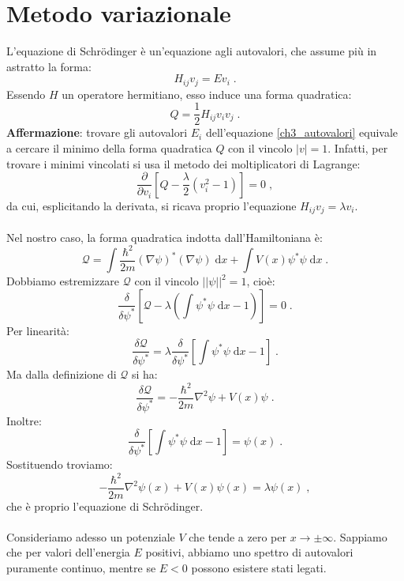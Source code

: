 \documentclass[12pt,a4paper]{report}
\theoremstyle{definition}
\numberwithin{equation}{section}
\newcommand{\diff}[1][]{\mathrm{d}#1}
\begin{document}
\section{Metodo variazionale}
L'equazione di Schrödinger è un'equazione agli autovalori, che assume più in astratto la forma:
\begin{equation}
H_{ij}v_j=Ev_i\;. \label{ch3_autovalori}
\end{equation}
Essendo $H$ un operatore hermitiano, esso induce una forma quadratica:
\begin{equation}
Q=\frac{1}{2}H_{ij}v_iv_j\;.
\end{equation}
\textbf{Affermazione}: trovare gli autovalori $E_i$ dell'equazione \eqref{ch3_autovalori} equivale a cercare il minimo della forma quadratica $Q$ con il vincolo $|v|=1$. Infatti, per trovare i minimi vincolati si usa il metodo dei moltiplicatori di Lagrange:
$$
\frac{\partial}{\partial v_i}\left[Q-\frac{\lambda}{2}(v_i^2-1)\right]=0\;,
$$
da cui, esplicitando la derivata, si ricava proprio l'equazione $H_{ij}v_j=\lambda v_i$. \\
\\
Nel nostro caso, la forma quadratica indotta dall'Hamiltoniana è:
\begin{equation}
\mathcal{Q}=\int \frac{\hbar^2}{2m}(\nabla\psi)^*(\nabla\psi)\;\diff{x}+\int V(x)\psi^*\psi\;\diff{x}\;.
\end{equation}
Dobbiamo estremizzare $\mathcal{Q}$ con il vincolo $||\psi||^2=1$, cioè:
$$
\frac{\delta}{\delta\psi^*}\left[\mathcal{Q}-\lambda\left(\int\psi^*\psi\;\diff{x}-1\right)\right]=0\;.
$$
Per linearità:
$$
\frac{\delta\mathcal{Q}}{\delta\psi^*}=\lambda\frac{\delta}{\delta\psi^*}\left[\int\psi^*\psi\;\diff{x}-1\right]\;.
$$
Ma dalla definizione di $\mathcal{Q}$ si ha:
\begin{equation}
\frac{\delta\mathcal{Q}}{\delta\psi^*}=-\frac{\hbar^2}{2m}\nabla^2\psi+V(x)\psi\;.
\end{equation}
Inoltre:
\begin{equation}
\frac{\delta}{\delta\psi^*}\left[\int\psi^*\psi\;\diff{x}-1\right]=\psi(x)\;.
\end{equation}
Sostituendo troviamo:
\begin{equation}
-\frac{\hbar^2}{2m}\nabla^2\psi(x)+V(x)\psi(x)=\lambda\psi(x)\;,
\end{equation}
che è proprio l'equazione di Schrödinger. \\
\\
Consideriamo adesso un potenziale $V$ che tende a zero per $x\to\pm\infty$. Sappiamo che per valori dell'energia $E$ positivi, abbiamo uno spettro di autovalori puramente continuo, mentre se $E<0$ possono esistere stati legati. \\
\end{document}
